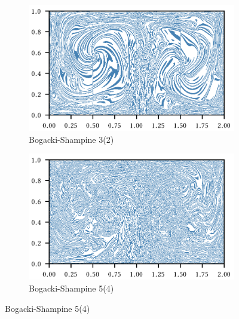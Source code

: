 \begin{figure}[htpb]
    \centering
    \begin{subfigure}[b]{0.475\textwidth}
        \centering
        \includegraphics{figures/domain_figures/rkbs32_err_half_width.png}
        \caption[]{{\small Bogacki-Shampine 3(2)}}
        \label{fig:u0_dom_err_bs32}
    \end{subfigure}
    \begin{subfigure}[b]{0.475\textwidth}
        \centering
        \includegraphics{figures/domain_figures/rkbs54_err_half_width.png}
        \caption[]{{\small Bogacki-Shampine 5(4)}}
        \label{fig:u0_dom_err_bs54}
    \end{subfigure}


\end{figure}
